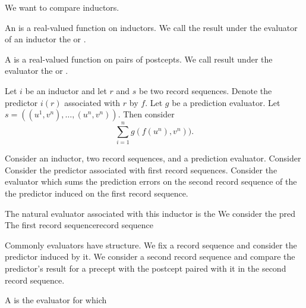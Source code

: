 
\sbasic














\sstart
{}


We want to compare inductors.


An 
is a real-valued function
on inductors.
We call the result under the
evaluator of an inductor the
 or
.

A 
is a real-valued function on
pairs of postcepts.
We call result under the evaluator
the  or
.


Let $i$ be an inductor and let
$r$ and $s$ be two record sequences.
Denote the predictor $i(r)$ associated
with $r$ by $f$.
Let $g$ be a prediction evaluator.
Let $s = ((u^1, v^n), \dots, (u^n, v^n))$.
Then consider
\[
  \sum_{i = 1}^{n} g(f(u^n), v^n)).
\]



Consider an inductor, two record
sequences, and a prediction evaluator.
Consider
Consider the predictor
associated with first record sequences.
Consider the evaluator which
sums the prediction errors on the
second record sequence of the
the predictor induced on the first record
sequence.

The natural evaluator associated with
this inductor is the
We consider the pred
The first record sequencerecord sequence

Commonly evaluators have
structure.
We fix a record sequence
and consider the predictor
induced by it.
We consider a second
record sequence
and compare the predictor's
result for a precept with
the postcept paired with it
in the second record sequence.


A  is
the evaluator for which
\strats
